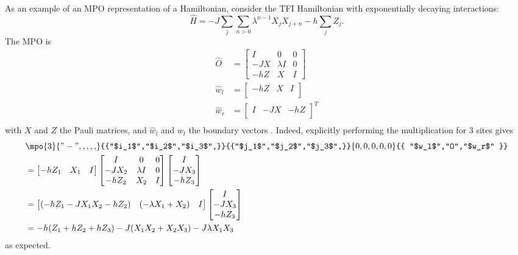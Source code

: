 As an example of an MPO representation of a Hamiltonian, consider the \Gls{TFI} Hamiltonian with exponentially decaying interactions:
\begin{equation}
  \hat{H} =  -J   \sum_{j}   \sum_{n>0} \lambda^{n-1} X_j X_{j+n} - h \sum_j Z_j .
\end{equation}
The MPO is
\begin{equation}
  \begin{split}
    \hat{O} &= \begin{bmatrix}
      I    & 0         & 0 \\
      -J X & \lambda I & 0 \\
      -h Z & X         & I
    \end{bmatrix} \\
    \hat{w}_l &= \begin{bmatrix}
      -h Z & X & I \\
    \end{bmatrix} \\
    \hat{w}_r &= \begin{bmatrix}
      I & -J  X & -h Z \\
    \end{bmatrix}^T \\
  \end{split}
\end{equation}
with $X$ and  $Z$ the Pauli matrices, and  $\hat{w}_l$ and  $\hat{w}_l$ the boundary vectors \cite{Zauner-Stauber2018}. Indeed, explicitly performing the multiplication for 3 sites gives
\begin{align}
   & \mpo{3}{{"-",,,,,}}{{"$i_1$","$i_2$","$i_3$",}}{{"$j_1$","$j_2$","$j_3$",}}{{0,0,0,0,0}}{{ "$w_l$","O","$w_r$" }} \\
   & = \begin{bmatrix}
    -h Z_1 & X_1 & I \\
  \end{bmatrix} \begin{bmatrix}
    I      & 0         & 0 \\
    -J X_2 & \lambda I & 0 \\
    -h Z_2 & X_2       & I
  \end{bmatrix}\begin{bmatrix}
    I       \\
    -J  X_3 \\
    -h Z_3  \\
  \end{bmatrix}                                 \\
   & =  \begin{bmatrix}
    ( -h Z_1 - J X_1 X_2 - h Z_2 ) & (- \lambda X_1 + X_2) & I \\
  \end{bmatrix} \begin{bmatrix}
    I       \\
    -J  X_3 \\
    -h Z_3  \\
  \end{bmatrix}                                                          \\
   & = -h ( Z_1 + h Z_2 + h Z_3 ) - J (X_1 X_2+ X_2 X_3 ) - J \lambda X_1 X_3
\end{align}
as expected.

